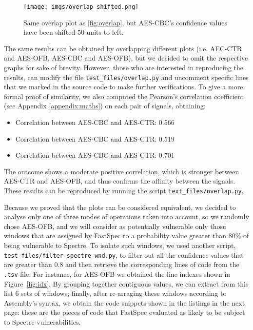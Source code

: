 \documentclass[target=mst,aauheader=aics]{thud}
\theoremstyle{definition}
\begin{document}
	\begin{figure}
		\hspace*{-0.7cm}
		\texttt{[image: imgs/overlap\_shifted.png]}
		\caption{Same overlap plot as \ref{fig:overlap}, but AES-CBC's confidence values have been shifted 50 units to left.}
		\label{fig:overlap-shifted}
	\end{figure}

	The same results can be obtained by overlapping different plots (i.e. AEC-CTR and AES-OFB, AES-CBC and AES-OFB), but we decided to omit the respective graphs for sake of brevity. However, those who are interested in reproducing the results, can modify the file \texttt{test\_files/overlap.py} and uncomment specific lines that we marked in the source code to make further verifications. To give a more formal proof of similarity, we also computed the Pearson's correlation coefficient (see Appendix \ref{appendix:maths}) on each pair of signals, obtaining:
	\begin{itemize}
		\item Correlation between AES-CBC and AES-CTR: 0.566
		\item Correlation between AES-CBC and AES-CTR: 0.519
		\item Correlation between AES-CBC and AES-CTR: 0.701
	\end{itemize}
	The outcome shows a moderate positive correlation, which is stronger between AES-CTR and AES-OFB, and thus confirms the affinity between the signals. These results can be reproduced by running the script \texttt{text\_files/overlap.py}.
	
	Because we proved that the plots can be considered equivalent, we decided to analyse only one of three modes of operations taken into account, so we randomly chose AES-OFB, and we will consider as potentially vulnerable only those windows that are assigned by FastSpec to a probability value greater than 80\% of being vulnerable to Spectre. To isolate such windows, we used another script, \texttt{test\_files/filter\_spectre\_wnd.py}, to filter out all the confidence values that are greater than 0.8 and then retrieve the corresponding lines of code from the \texttt{.tsv} file. For instance, for AES-OFB we obtained the line indexes shown in Figure~\ref{fig:idx}. By grouping together contiguous values, we can extract from this list 6 sets of windows; finally, after re-arraging these windows according to Assembly's 
	syntax, we obtain the code snippets shown in the listings in the next page: these are the pieces of code that FastSpec evaluated as likely to be subject to Spectre vulnerabilities.
	
\end{document}
